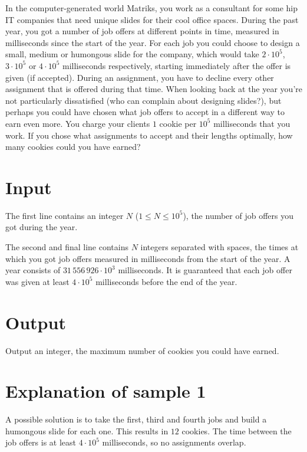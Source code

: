 In the computer-generated world Matriks, you work as a consultant for some hip IT companies that need unique slides for their cool office spaces.
During the past year, you got a number of job offers at different points in time, measured in milliseconds since the start of the year.
For each job you could choose to design a small, medium or humongous slide for the company, which would take $2 \cdot 10^5$, $3 \cdot 10^5$ or $4 \cdot 10^5$ milliseconds respectively, starting immediately after the offer is given (if accepted).
During an assignment, you have to decline every other assignment that is offered during that time.
When looking back at the year you're not particularly dissatisfied (who can complain about designing slides?), but perhaps you could have chosen what job offers to accept in a different way to earn even more.
You charge your clients $1$ cookie per $10^5$ milliseconds that you work.
If you chose what assignments to accept and their lengths optimally, how many cookies could you have earned?

\section*{Input}
The first line contains an integer $N$ ($1 \le N \le 10^5$), the number of job offers you got during the year.

The second and final line contains $N$ integers separated with spaces, the times at which you got job offers measured in milliseconds from the start of the year.
A year consists of $31\,556\,926 \cdot 10^3$ milliseconds.
It is guaranteed that each job offer was given at least $4 \cdot 10^5$ milliseconds before the end of the year.

\section*{Output}
Output an integer, the maximum number of cookies you could have earned.

\section*{Explanation of sample 1}
A possible solution is to take the first, third and fourth jobs and build a humongous slide for each one.
This results in $12$ cookies.
The time between the job offers is at least $4 \cdot 10^5$ milliseconds, so no assignments overlap.
